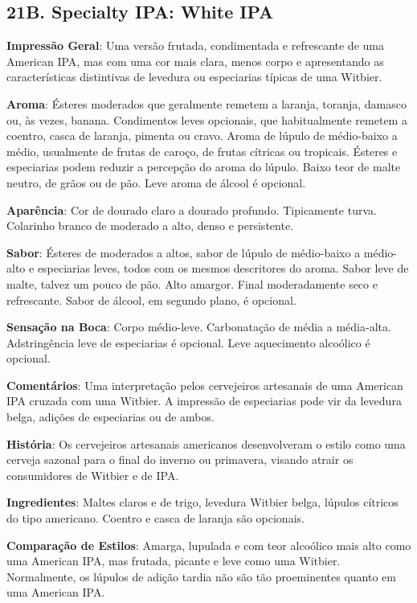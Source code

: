 \subsection*{21B. Specialty IPA: White IPA}
\textbf{Impressão Geral}: Uma versão frutada, condimentada e refrescante de uma American IPA, mas com uma cor mais clara, menos corpo e apresentando as características distintivas de levedura ou especiarias típicas de uma Witbier.

\textbf{Aroma}: Ésteres moderados que geralmente remetem a laranja, toranja, damasco ou, às vezes, banana. Condimentos leves opcionais, que habitualmente remetem a coentro, casca de laranja, pimenta ou cravo. Aroma de lúpulo de médio-baixo a médio, usualmente de frutas de caroço, de frutas cítricas ou tropicais. Ésteres e especiarias podem reduzir a percepção do aroma do lúpulo. Baixo teor de malte neutro, de grãos ou de pão. Leve aroma de álcool é opcional.

\textbf{Aparência}: Cor de dourado claro a dourado profundo. Tipicamente turva. Colarinho branco de moderado a alto, denso e persistente.

\textbf{Sabor}: Ésteres de moderados a altos, sabor de lúpulo de médio-baixo a médio-alto e especiarias leves, todos com os mesmos descritores do aroma. Sabor leve de malte, talvez um pouco de pão. Alto amargor. Final moderadamente seco e refrescante. Sabor de álcool, em segundo plano, é opcional.

\textbf{Sensação na Boca}: Corpo médio-leve. Carbonatação de média a média-alta. Adstringência leve de especiarias é opcional. Leve aquecimento alcoólico é opcional.

\textbf{Comentários}: Uma interpretação pelos cervejeiros artesanais de uma American IPA cruzada com uma Witbier. A impressão de especiarias pode vir da levedura belga, adições de especiarias ou de ambos.

\textbf{História}: Os cervejeiros artesanais americanos desenvolveram o estilo como uma cerveja sazonal para o final do inverno ou primavera, visando atrair os consumidores de Witbier e de IPA.

\textbf{Ingredientes}: Maltes claros e de trigo, levedura Witbier belga, lúpulos cítricos do tipo americano. Coentro e casca de laranja são opcionais.

\textbf{Comparação de Estilos}: Amarga, lupulada e com teor alcoólico mais alto como uma American IPA, mas frutada, picante e leve como uma Witbier. Normalmente, os lúpulos de adição tardia não são tão proeminentes quanto em uma American IPA.

